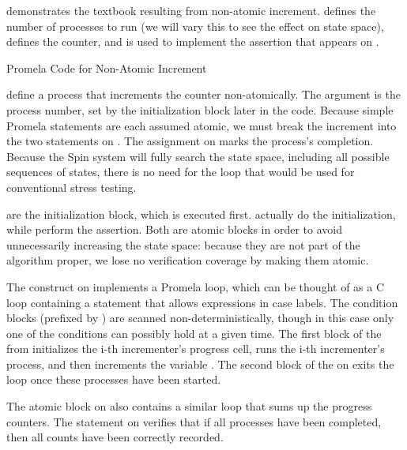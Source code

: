 \begin{fcvref}
demonstrates the textbook 
resulting from non-atomic increment.
 defines the number of processes to run (we will vary this
to see the effect on state space),  defines the counter,
and  is used to implement the assertion that appears on
.

\begin{listing}

\caption{Promela Code for Non-Atomic Increment}
\label{lst:formal:Promela Code for Non-Atomic Increment}
\end{listing}

 define a process that increments
the counter non-atomically.
The argument  is the process number, set by the initialization
block later in the code.
Because simple Promela statements are each assumed atomic, we must
break the increment into the two statements on
.
The assignment on  marks the process's completion.
Because the Spin system will fully search the state space, including
all possible sequences of states, there is no need for the loop
that would be used for conventional stress testing.

 are the initialization block,
which is executed first.
 actually do the initialization,
while 
perform the assertion.
Both are atomic blocks in order to avoid unnecessarily increasing
the state space: because they are not part of the algorithm proper,
we lose no verification coverage by making them atomic.

The  construct on 
implements a Promela loop,
which can be thought of as a C  loop containing a
 statement that allows expressions in case labels.
The condition blocks (prefixed by \co{::})
are scanned non-deterministically,
though in this case only one of the conditions can possibly hold at a given
time.
The first block of the  from
initializes the i-th
incrementer's progress cell, runs the i-th incrementer's process, and
then increments the variable .
The second block of the  on
 exits the loop once
these processes have been started.

The atomic block on  also contains
a similar 
loop that sums up the progress counters.
The  statement on  verifies that
if all processes
have been completed, then all counts have been correctly recorded.
\end{fcvref}

